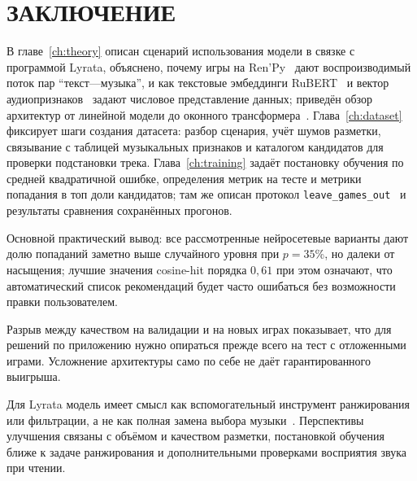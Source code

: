 \chapter*{\large ЗАКЛЮЧЕНИЕ}

В главе~\ref{ch:theory} описан сценарий использования модели в связке с программой Lyrata, объяснено, почему игры на Ren'Py~\cite{srcrenpydocs} дают воспроизводимый поток пар ``текст---музыка'', и как текстовые эмбеддинги RuBERT~\cite{kuratov2019,devlin2018} и вектор аудиопризнаков~\cite{librosa} задают числовое представление данных; приведён обзор архитектур от линейной модели до оконного трансформера~\cite{vaswani2017,nikolenko2018}. Глава~\ref{ch:dataset} фиксирует шаги создания датасета: разбор сценария, учёт шумов разметки, связывание с таблицей музыкальных признаков и каталогом кандидатов для проверки подстановки трека. Глава~\ref{ch:training} задаёт постановку обучения по средней квадратичной ошибке, определения метрик на тесте и метрики попадания в топ доли кандидатов; там же описан протокол \texttt{leave\_games\_out}~ и результаты сравнения сохранённых прогонов.

Основной практический вывод: все рассмотренные нейросетевые варианты дают долю попаданий заметно выше случайного уровня при $p = 35$\%, но далеки от насыщения; лучшие значения cosine-hit порядка $0{,}61$ при этом означают, что автоматический список рекомендаций будет часто ошибаться без возможности правки пользователем.

Разрыв между качеством на валидации и на новых играх показывает, что для решений по приложению нужно опираться прежде всего на тест с отложенными играми. Усложнение архитектуры само по себе не даёт гарантированного выигрыша.

Для Lyrata модель имеет смысл как вспомогательный инструмент ранжирования или фильтрации, а не как полная замена выбора музыки~\cite{nikolenko2018}. Перспективы улучшения связаны с объёмом и качеством разметки, постановкой обучения ближе к задаче ранжирования и дополнительными проверками восприятия звука при чтении.
